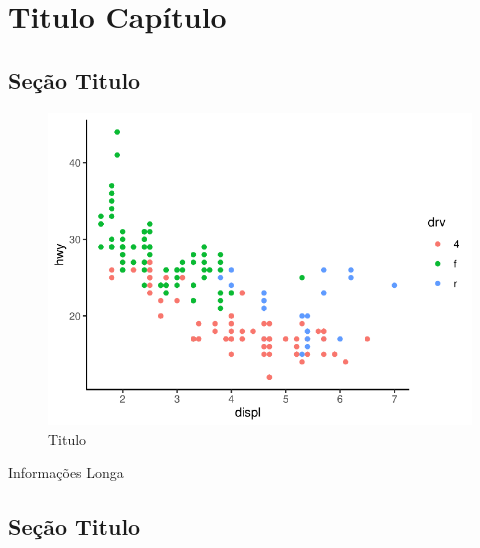 \chapter{Titulo Capítulo}
\section{Seção Titulo}
	
\lipsum[1-2]
	
\begin{figure}[h]
	\caption{Titulo}
	\includegraphics[width=\linewidth]{fig/plot}
\end{figure}
	
\lipsum[1]
	
\begin{bbox}{Informações Longa}
	\lipsum[1-2]
\end{bbox}
	
\section{Seção Titulo}
	
\lipsum[1-2]
	
